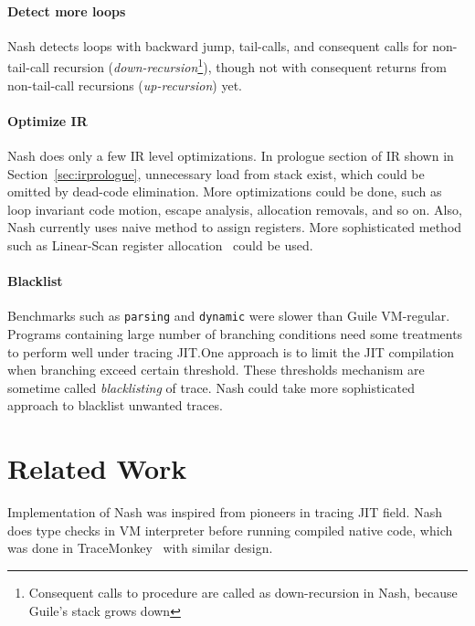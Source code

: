 \documentclass[preprint, 10pt]{sigplanconf}
\begin{document}
\paragraph{Detect more loops} Nash detects loops with backward jump,
tail-calls, and consequent calls for non-tail-call recursion
(\textit{down-recursion}\footnote{Consequent calls to procedure are called as
  down-recursion in Nash, because Guile's stack grows down}), though not with
consequent returns from non-tail-call recursions (\textit{up-recursion}) yet.


\paragraph{Optimize IR} Nash does only a few IR level
optimizations. In prologue section of IR shown in
Section~\hyperref[sec:irprologue]{\ref{sec:irprologue}}, unnecessary load from
stack exist, which could be omitted by dead-code elimination. More optimizations
could be done, such as loop invariant code motion, escape analysis, allocation
removals, and so on. Also, Nash currently uses naive method to assign
registers. More sophisticated method such as Linear-Scan register
allocation~\cite{poletto1999linear} could be used.

\paragraph{Blacklist} Benchmarks such as \texttt{parsing} and
\texttt{dynamic} were slower than Guile VM-regular. Programs containing large
number of branching conditions need some treatments to perform well under
tracing JIT.\@ One approach is to limit the JIT compilation when branching
exceed certain threshold. These thresholds mechanism are sometime called
\textit{blacklisting} of trace. Nash could take more sophisticated approach to
blacklist unwanted traces.

\section{Related Work}
\label{sec:related}
Implementation of Nash was inspired from pioneers in tracing JIT field. Nash
does type checks in VM interpreter before running compiled native code, which
was done in TraceMonkey~\cite{gal2009trace} with similar design.
\end{document}
